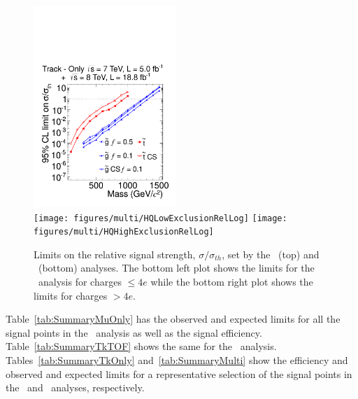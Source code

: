 \begin{figure}
\centering
  \includegraphics[clip=false, trim=0.0cm 0cm 0.0cm 0cm, width=0.48\textwidth]{figures/tkonly/TkExclusionRelLog} \\
  \texttt{[image: figures/multi/HQLowExclusionRelLog]}
  \texttt{[image: figures/multi/HQHighExclusionRelLog]}
\caption[Limits on the relative signal strength, $\sigma/\sigma_{th}$, set by the \tkonly\ and \multi\ analyses]
{Limits on the relative signal strength, $\sigma/\sigma_{th}$,  set by the \tkonly\ (top) and \multi\ (bottom) analyses.
The bottom left plot shows the limits for the \multi\ analysis for charges $\le 4e$ while the bottom right plot shows the limits for charges $> 4e$.
}
    \label{fig:TkRelExclusion}
\end{figure}

Table~\ref{tab:SummaryMuOnly} has the observed and expected limits for all the signal points in the \muononly\ analysis as well as the signal efficiency. 
Table~\ref{tab:SummaryTkTOF} shows the same for the \tktof\ analysis. Tables~\ref{tab:SummaryTkOnly} and~\ref{tab:SummaryMulti} show the efficiency
and observed and expected limits for a representative selection of the signal points in the \tkonly\ and \multi\ analyses, respectively.

